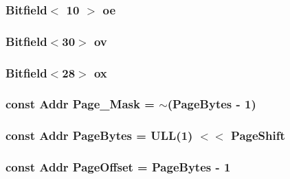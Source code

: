 \label{namespacePowerISA_a568d4aa96dd7cd963f3b1b1b0446c9c6}
\hypertarget{namespacePowerISA_a63100c617cc64be1e6989c06e7ec9bbd}{
\subsubsection[{oe}]{\setlength{\rightskip}{0pt plus 5cm}Bitfield$<$ 10 $>$ {\bf oe}}}
\label{namespacePowerISA_a63100c617cc64be1e6989c06e7ec9bbd}
\hypertarget{namespacePowerISA_a186f045af2f938c2fac77f8e6656b693}{
\subsubsection[{ov}]{\setlength{\rightskip}{0pt plus 5cm}Bitfield$<$30$>$ {\bf ov}}}
\label{namespacePowerISA_a186f045af2f938c2fac77f8e6656b693}
\hypertarget{namespacePowerISA_a624be297d49dd726a1d6b9925a9b9c23}{
\subsubsection[{ox}]{\setlength{\rightskip}{0pt plus 5cm}Bitfield$<$28$>$ {\bf ox}}}
\label{namespacePowerISA_a624be297d49dd726a1d6b9925a9b9c23}
\hypertarget{namespacePowerISA_ac2d47d845cf48dbc176f717bb7d50a7f}{
\subsubsection[{Page\_\-Mask}]{\setlength{\rightskip}{0pt plus 5cm}const {\bf Addr} {\bf Page\_\-Mask} = $\sim$({\bf PageBytes} -\/ 1)}}
\label{namespacePowerISA_ac2d47d845cf48dbc176f717bb7d50a7f}
\hypertarget{namespacePowerISA_ad9d6a4d965e107c9a7214f096107296b}{
\subsubsection[{PageBytes}]{\setlength{\rightskip}{0pt plus 5cm}const {\bf Addr} {\bf PageBytes} = ULL(1) $<$$<$ {\bf PageShift}}}
\label{namespacePowerISA_ad9d6a4d965e107c9a7214f096107296b}
\hypertarget{namespacePowerISA_a51e1064f1269394dc26702651be5061f}{
\subsubsection[{PageOffset}]{\setlength{\rightskip}{0pt plus 5cm}const {\bf Addr} {\bf PageOffset} = {\bf PageBytes} -\/ 1}}
